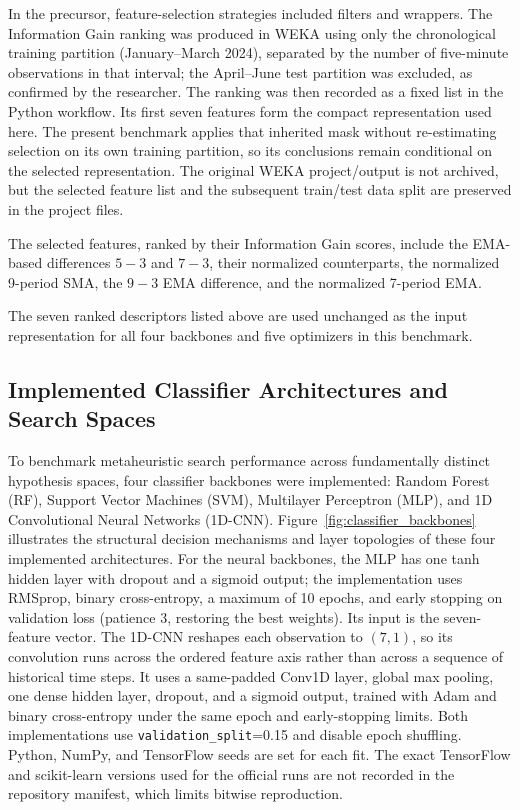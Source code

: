 In the precursor, feature-selection strategies included filters and wrappers. The Information Gain ranking was produced in WEKA using only the chronological training partition (January--March 2024), separated by the number of five-minute observations in that interval; the April--June test partition was excluded, as confirmed by the researcher. The ranking was then recorded as a fixed list in the Python workflow. Its first seven features form the compact representation used here. The present benchmark applies that inherited mask without re-estimating selection on its own training partition, so its conclusions remain conditional on the selected representation. The original WEKA project/output is not archived, but the selected feature list and the subsequent train/test data split are preserved in the project files.

The selected features, ranked by their Information Gain scores, include the EMA-based differences $5\!-\!3$ and $7\!-\!3$, their normalized counterparts, the normalized 9-period SMA, the $9\!-\!3$ EMA difference, and the normalized 7-period EMA. 

The seven ranked descriptors listed above are used unchanged as the input representation for all four backbones and five optimizers in this benchmark.

\subsection{Implemented Classifier Architectures and Search Spaces}
\label{sec:classifier_architectures}

To benchmark metaheuristic search performance across fundamentally distinct hypothesis spaces, four classifier backbones were implemented: Random Forest (RF), Support Vector Machines (SVM), Multilayer Perceptron (MLP), and 1D Convolutional Neural Networks (1D-CNN). Figure~\ref{fig:classifier_backbones} illustrates the structural decision mechanisms and layer topologies of these four implemented architectures.
For the neural backbones, the MLP has one tanh hidden layer with dropout and a sigmoid output; the implementation uses RMSprop, binary cross-entropy, a maximum of 10 epochs, and early stopping on validation loss (patience 3, restoring the best weights). Its input is the seven-feature vector. The 1D-CNN reshapes each observation to $(7,1)$, so its convolution runs across the ordered feature axis rather than across a sequence of historical time steps. It uses a same-padded Conv1D layer, global max pooling, one dense hidden layer, dropout, and a sigmoid output, trained with Adam and binary cross-entropy under the same epoch and early-stopping limits. Both implementations use \texttt{validation\_split}=0.15 and disable epoch shuffling. Python, NumPy, and TensorFlow seeds are set for each fit. The exact TensorFlow and scikit-learn versions used for the official runs are not recorded in the repository manifest, which limits bitwise reproduction.



